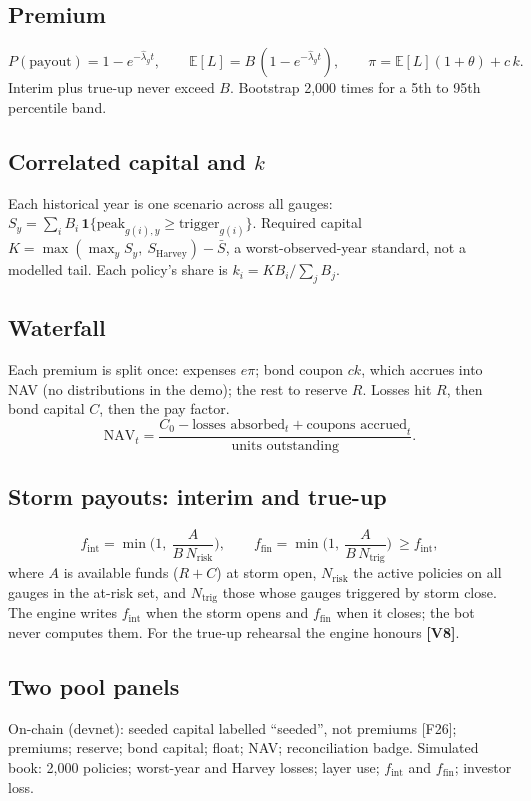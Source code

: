 \documentclass[11pt]{article}
\newcommand{\code}[1]{\texttt{\detokenize{#1}}}
\newcommand{\fix}[1]{\textcolor{fixgreen}{\textbf{[#1]}}}
\begin{document}
\subsection{Premium}
\[ P(\text{payout}) = 1 - e^{-\hat\lambda_g t}, \qquad \mathbb{E}[L] = B\,(1 - e^{-\hat\lambda_g t}), \qquad \pi = \mathbb{E}[L](1+\theta) + c\,k. \]
Interim plus true-up never exceed $B$. Bootstrap 2,000 times for a 5th to 95th percentile band.

\subsection{Correlated capital and $k$}
Each historical year is one scenario across all gauges: $S_y = \sum_{i} B_i\,\mathbf{1}\{\text{peak}_{g(i),y} \ge \text{trigger}_{g(i)}\}$. Required capital $K = \max(\max_y S_y,\ S_\text{Harvey}) - \bar S$, a worst-observed-year standard, not a modelled tail. Each policy's share is $k_i = K B_i / \sum_j B_j$.

\subsection{Waterfall}
Each premium is split once: expenses $e\pi$; bond coupon $ck$, which accrues into NAV (no distributions in the demo); the rest to reserve $R$. Losses hit $R$, then bond capital $C$, then the pay factor.
\[ \text{NAV}_t = \frac{C_0 - \text{losses absorbed}_t + \text{coupons accrued}_t}{\text{units outstanding}}. \]

\subsection{Storm payouts: interim and true-up}
\[ f_\text{int} = \min\Big(1,\ \frac{A}{B\,N_\text{risk}}\Big), \qquad f_\text{fin} = \min\Big(1,\ \frac{A}{B\,N_\text{trig}}\Big) \ \ge f_\text{int}, \]
where $A$ is available funds ($R + C$) at storm open, $N_\text{risk}$ the active policies on all gauges in the at-risk set, and $N_\text{trig}$ those whose gauges triggered by storm close. The engine writes $f_\text{int}$ when the storm opens and $f_\text{fin}$ when it closes; the bot never computes them. For the true-up rehearsal the engine honours \code{FORCE_F_INT} \fix{V8}.

\subsection{Two pool panels}
On-chain (devnet): seeded capital labelled ``seeded'', not premiums [F26]; premiums; reserve; bond capital; float; NAV; reconciliation badge. Simulated book: 2,000 policies; worst-year and Harvey losses; layer use; $f_\text{int}$ and $f_\text{fin}$; investor loss.
\end{document}
